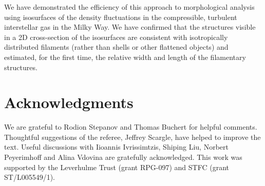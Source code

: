 \documentclass[useAMS,usenatbib]{mn2e}
\begin{document}
We have demonstrated the efficiency of this approach to morphological analysis
using isosurfaces of the density fluctuations in the compressible, turbulent
interstellar gas in the Milky Way. We have confirmed that the structures
visible in a 2D cross-section of the isosurfaces are consistent with
isotropically distributed filaments (rather than shells or other flattened
objects) and estimated, for the first time, the relative width and length of
the filamentary structures.

\mbox{}\vspace*{-27pt}%

\section*{Acknowledgments}
We are grateful to Rodion Stepanov and Thomas Buchert for helpful comments.
Thoughtful suggestions of the referee, Jeffrey Scargle, have helped to improve
the text. Useful discussions with Iioannis Ivrissimtzis,  Shiping Liu, Norbert
Peyerimhoff and Alina Vdovina are gratefully acknowledged. This work was
supported by the Leverhulme Trust (grant RPG-097) and STFC (grant
ST/L005549/1).



\label{lastpage}
\end{document}
